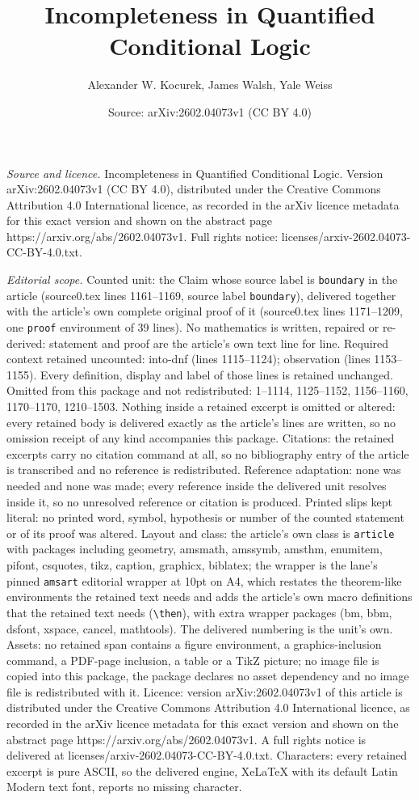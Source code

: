 \documentclass[10pt,a4paper]{amsart}
\title[Incompleteness in Quantified Conditional Logic]{Incompleteness in Quantified Conditional Logic}
\author{Alexander W. Kocurek, James Walsh, Yale Weiss}
\date{Source: arXiv:2602.04073v1 (CC BY 4.0)}
\begin{document}
\maketitle

\noindent\emph{Source and licence.} Incompleteness in Quantified Conditional Logic. Version arXiv:2602.04073v1 (CC BY 4.0), distributed under the Creative Commons Attribution 4.0 International licence, as recorded in the arXiv licence metadata for this exact version and shown on the abstract page https://arxiv.org/abs/2602.04073v1. Full rights notice: licenses/arxiv-2602.04073-CC-BY-4.0.txt.\par\smallskip

\noindent\textit{Editorial scope.} Counted unit: the Claim whose source label is \texttt{boundary} in the article (source0.tex lines 1161--1169, source label \texttt{boundary}), delivered together with the article's own complete original proof of it (source0.tex lines 1171--1209, one \texttt{proof} environment of 39 lines). No mathematics is written, repaired or re-derived: statement and proof are the article's own text line for line. Required context retained uncounted: into-dnf (lines 1115--1124); observation (lines 1153--1155). Every definition, display and label of those lines is retained unchanged. Omitted from this package and not redistributed: 1--1114, 1125--1152, 1156--1160, 1170--1170, 1210--1503. Nothing inside a retained excerpt is omitted or altered: every retained body is delivered exactly as the article's lines are written, so no omission receipt of any kind accompanies this package. Citations: the retained excerpts carry no citation command at all, so no bibliography entry of the article is transcribed and no reference is redistributed. Reference adaptation: none was needed and none was made; every reference inside the delivered unit resolves inside it, so no unresolved reference or citation is produced. Printed slips kept literal: no printed word, symbol, hypothesis or number of the counted statement or of its proof was altered. Layout and class: the article's own class is \texttt{article} with packages including geometry, amsmath, amssymb, amsthm, enumitem, pifont, csquotes, tikz, caption, graphicx, biblatex; the wrapper is the lane's pinned \texttt{amsart} editorial wrapper at 10pt on A4, which restates the theorem-like environments the retained text needs and adds the article's own macro definitions that the retained text needs (\texttt{\textbackslash then}), with extra wrapper packages (bm, bbm, dsfont, xspace, cancel, mathtools). The delivered numbering is the unit's own. Assets: no retained span contains a figure environment, a graphics-inclusion command, a PDF-page inclusion, a table or a TikZ picture; no image file is copied into this package, the package declares no asset dependency and no image file is redistributed with it. Licence: version arXiv:2602.04073v1 of this article is distributed under the Creative Commons Attribution 4.0 International licence, as recorded in the arXiv licence metadata for this exact version and shown on the abstract page https://arxiv.org/abs/2602.04073v1. A full rights notice is delivered at licenses/arxiv-2602.04073-CC-BY-4.0.txt. Characters: every retained excerpt is pure ASCII, so the delivered engine, XeLaTeX with its default Latin Modern text font, reports no missing character.
\end{document}
